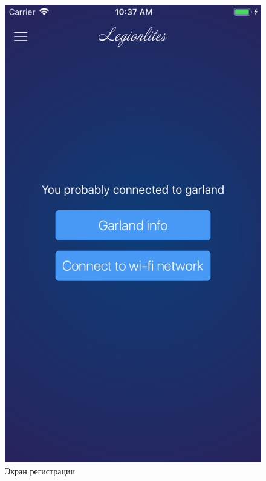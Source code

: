 \begin{figure}[H]
\centering
	\includegraphics[scale=0.2]{figures/userGuide/device.png}
	\caption{Экран регистрации}
	\label{fig:develop:userGuide:device}
\end{figure}


